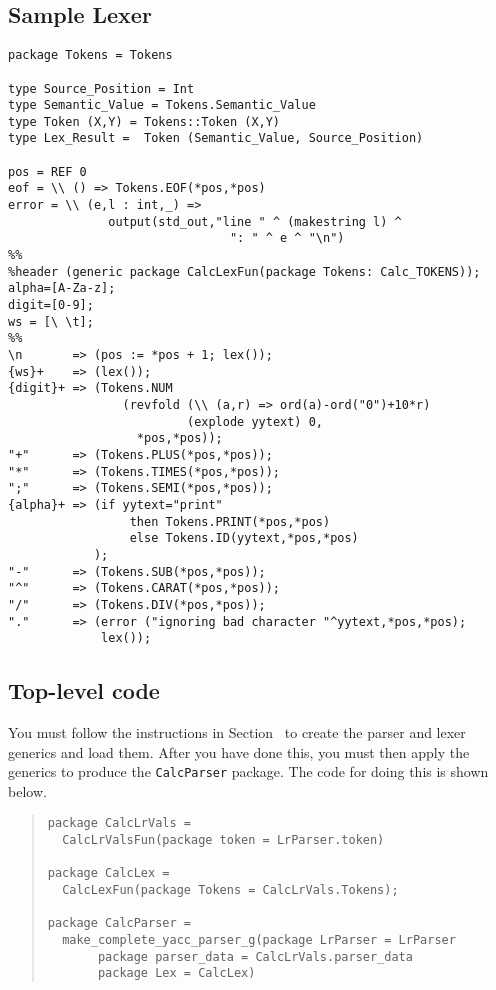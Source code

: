 \subsection{Sample Lexer}
\begin{tt}
\begin{verbatim}
package Tokens = Tokens

type Source_Position = Int
type Semantic_Value = Tokens.Semantic_Value
type Token (X,Y) = Tokens::Token (X,Y)
type Lex_Result =  Token (Semantic_Value, Source_Position)

pos = REF 0
eof = \\ () => Tokens.EOF(*pos,*pos)
error = \\ (e,l : int,_) =>
              output(std_out,"line " ^ (makestring l) ^
                               ": " ^ e ^ "\n")
%%
%header (generic package CalcLexFun(package Tokens: Calc_TOKENS));
alpha=[A-Za-z];
digit=[0-9];
ws = [\ \t];
%%
\n       => (pos := *pos + 1; lex());
{ws}+    => (lex());
{digit}+ => (Tokens.NUM
                (revfold (\\ (a,r) => ord(a)-ord("0")+10*r)
                         (explode yytext) 0,
                  *pos,*pos));
"+"      => (Tokens.PLUS(*pos,*pos));
"*"      => (Tokens.TIMES(*pos,*pos));
";"      => (Tokens.SEMI(*pos,*pos));
{alpha}+ => (if yytext="print"
                 then Tokens.PRINT(*pos,*pos)
                 else Tokens.ID(yytext,*pos,*pos)
            );
"-"      => (Tokens.SUB(*pos,*pos));
"^"      => (Tokens.CARAT(*pos,*pos));
"/"      => (Tokens.DIV(*pos,*pos));
"."      => (error ("ignoring bad character "^yytext,*pos,*pos);
             lex());
\end{verbatim}
\end{tt}
\subsection{Top-level code}

You must follow the instructions in Section~
to create the parser and lexer generics and load them.  After you have
done this, you must then apply the generics to produce the {\tt CalcParser}
package.  The code for doing this is shown below.
\begin{quote}
\begin{verbatim}
package CalcLrVals =
  CalcLrValsFun(package token = LrParser.token)

package CalcLex =
  CalcLexFun(package Tokens = CalcLrVals.Tokens);

package CalcParser =
  make_complete_yacc_parser_g(package LrParser = LrParser
       package parser_data = CalcLrVals.parser_data
       package Lex = CalcLex)
\end{verbatim}
\end{quote}
 
